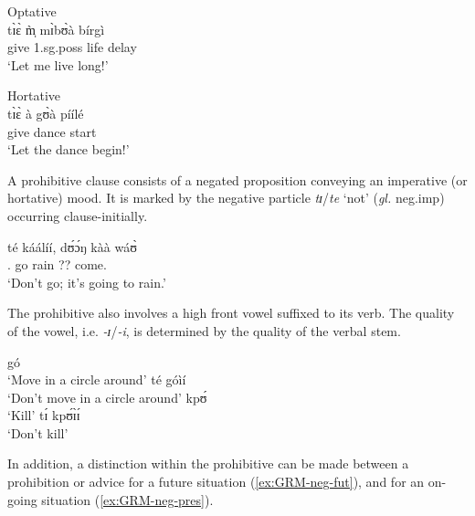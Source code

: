  

\ea\label{ex:GRM-hortative}

 
\ea\label{ex:GRM-hortative-vp11.3}{\rm Optative}\\
\gll tɪ̀ɛ̀ m̩̀ mɪ̀bʊ̀à bírgì \\
       give {\sc 1.sg.poss} life delay \\
\glt  `Let me live long!' 

\ex\label{ex:GRM-hortativ-vp11.4}{\rm Hortative}\\
\gll tɪ̀ɛ̀ à gʊ̀à píílé \\
     give {\art} dance start     \\
\glt  `Let the dance begin!'

\z 
 \z


A prohibitive clause consists of  a negated proposition conveying an imperative
(or hortative) mood. It is marked by 
the negative particle {\it tɪ}/{\it te} `not'   ({\it gl.} {\sc neg.imp})
occurring
clause-initially.


\ea\label{GRM-neg-imp-vp15.10.}
\gll té káálíí, dʊ́ɔ́ŋ kàà wáʊ̀ \\
     {\neg.\imp} go rain ?{\ipfv}? come.{\foc}   \\
\glt  `Don't go; it's going to rain.' 
\z
 
The prohibitive also involves a high front vowel   suffixed to its verb. The
quality of the vowel, i.e. {\it -ɪ}/{\it -i}, is determined by the quality of 
the
verbal stem.

\begin{multicols}{2}
\ea\label{ex:GRM-neg-imperative}
\ea gó\\
`Move in a circle around'
\ex té   góìí\\
`Don't move in a circle around'
\ex  kpʊ́\\
`Kill'
\ex  tɪ́    kpʊ́ɪ̀ɪ́\\
`Don't kill'
\z 

 \z
 \end{multicols}

In addition, a distinction within the prohibitive can be made
between a prohibition or advice for a future situation  (\ref{ex:GRM-neg-fut}), 
and  for an on-going situation (\ref{ex:GRM-neg-pres}). 


